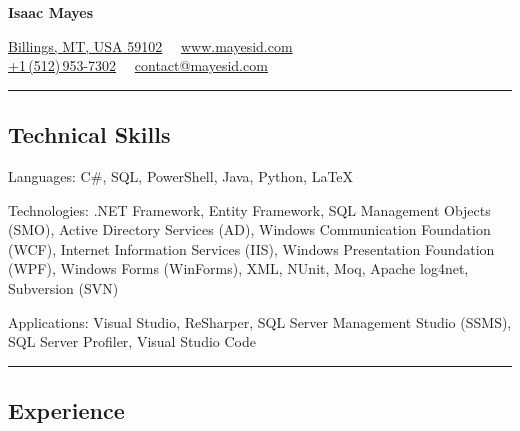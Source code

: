 \documentclass[9pt,letterpaper]{extarticle}
\newenvironment{indentsection}[1]%
{\begin{list}{}%
	{\setlength{\leftmargin}{#1}}%
	\item[]%
}
{\end{list}}
\begin{document}
\begin{center}
{\Huge \textbf{Isaac Mayes}}

\href{https://www.google.com/maps/place/Billings,+MT/}{Billings, MT, USA 59102}\ \textbullet
\ \href{http://www.mayesid.com}{www.mayesid.com}
\\
\href{tel:+15129537302}{+1\,(512)\,953-7302}\ \textbullet
\ \href{mailto:contact@mayesid.com}{contact@mayesid.com}
\end{center}

\hrule
\vspace{-0.2em}
\subsection*{Technical Skills}

\begin{indentsection}{\parindent}
\begin{description*}
	\item[Languages:]
	C\#, SQL, PowerShell, Java, Python, \LaTeX
	\item[Technologies:]
	.NET Framework, Entity Framework, SQL Management Objects (SMO), Active Directory Services (AD), Windows Communication Foundation (WCF), Internet Information Services (IIS), Windows Presentation Foundation (WPF), Windows Forms (WinForms), XML, NUnit, Moq, Apache log4net, Subversion (SVN)
	\item[Applications:]
	Visual Studio, ReSharper, SQL Server Management Studio (SSMS), SQL Server Profiler, Visual Studio Code
\end{description*}
\end{indentsection}

\hrule
\vspace{-0.2em}
\subsection*{Experience}
\end{document}
